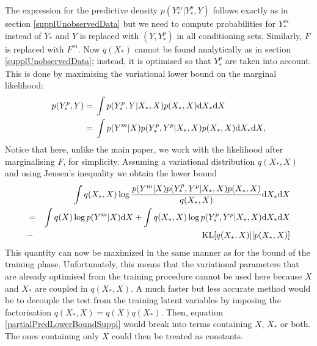 The expression for the predictive density $p(Y_*^m | Y_*^p, Y)$ follows exactly as in section \ref{supplUnobservedData} but we need to compute probabilities for $Y_*^m$ instead of $Y_*$ and $Y$ is replaced with $(Y, Y_*^p)$ in all conditioning sets. Similarly, $F$ is replaced with $F^m$. Now $q(X_*)$ cannot be found analytically as in section \ref{supplUnobservedData}; instead, it is optimised so that $Y_*^p$ are taken into account. 
This is done by maximising the variational lower bound on the marginal likelihood:
\begin{align}
p(Y_*^p, Y) ={}&  \int p(Y_*^p, Y|X_*, X) p(X_*, X) \text{d}  X_* \text{d}  X \nonumber \\
			={}&  \int p(Y^m | X) p(Y_*^p, Y^p|X_*, X) p(X_*, X) \text{d}  X_* \text{d}  X,  \nonumber
\end{align}  
Notice that here, unlike the main paper, we work with the likelihood after marginalising $F$, for simplicity.
Assuming a variational distribution 
$q(X_*, X)$ and using Jensen's inequality we obtain the 
lower bound 
\begin{eqnarray}
& & \int q(X_*, X) \log \frac{ p(Y^m | X) 
p(Y_*^p, Y^p|X_*, X) p(X_*,X)}{ q(X_*, X)} \text{d}  X_* \text{d}  X \nonumber \\ 
& = & \int q(X) \log p(Y^m | X) \text{d}  X 
+  \int q(X_*,X) \log p(Y_*^p, Y^p|X_*, X) \text{d}  X_* \text{d}  X  \nonumber \\
& - & \text{KL}[q(X_*,X) || p(X_*, X)] \label{partialPredLowerBoundSuppl}
\end{eqnarray}  
%
This quantity can now be maximized in the same manner as for the bound
of the training phase. Unfortunately, this means that the variational
parameters that are already optimised from the training procedure
cannot be used here because $X$ and $X_*$ are coupled in $q(X_*,X)$. A
much faster but less accurate method would be to decouple the test
from the training latent variables by imposing the factorisation
$q(X_*, X) = q(X) q(X_*)$. Then, equation
\eqref{partialPredLowerBoundSuppl} would break into terms containing $X$,
$X_*$ or both. The ones containing only $X$ could then be treated as
constants.


